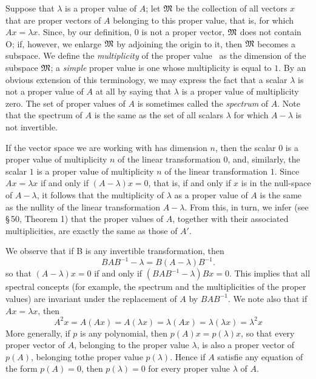 Suppose that \(\lambda\) is a proper value of \(A\); let \(\frak{M}\) be the
collection of all vectors \(x\) that are proper vectors of \(A\) belonging to
this proper value, that is, for which \(Ax = \lambda x\). Since, by our
definition, 0 is not a proper vector, \(\frak{M}\) does not contain O; if,
however, we enlarge \(\frak{M}\) by adjoining the origin to it, then
\(\frak{M}\) becomes a subspace. We define the \emph{multiplicity} of the proper
value \ as the dimension of the subspace \(\frak{M}\); a \emph{simple} proper
value is one whose multiplicity is equal to \(1\). By an obvious extension of
this terminology, we may express the fact that a scalar \(\lambda\) is not a
proper value of \(A\) at all by saying that \(\lambda\) is a proper value of
multiplicity zero. The set of proper values of \(A\) is sometimes called the
\emph{spectrum} of \(A\). Note that the spectrum of \(A\) is the same as the set
of all scalars \(\lambda\) for which \(A - \lambda\)  is not invertible.

If the vector space we are working with has dimension \(n\), then the scalar
\(0\) is a proper value of multiplicity \(n\) of the linear transformation
\(0\), and, similarly, the scalar \(1\) is a proper value of multiplicity \(n\)
of the linear transformation \(1\). Since \(Ax = \lambda x\) if and only if \((A
- \lambda)x = 0\), that is, if and only if \(x\) is in the null-space of \(A -
\lambda\), it follows that the multiplicity of \(\lambda\) as a proper value of
\(A\) is the same as the nullity of the linear transformation \(A - \lambda\).
From this, in turn, we infer (see \S\,50, Theorem 1) that the proper values of
\(A\), together with their associated multiplicities, are exactly the same as
those of \(A'\).

We observe that if B is any invertible transformation, then
\begin{equation*}
    BAB^{-1} - \lambda =B(A - \lambda)B^{-1}.
\end{equation*}
so that \((A - \lambda)x = 0\) if and only if \((BAB^{-1}- \lambda)Bx = 0\).
This implies that all spectral concepts (for example, the spectrum and the
multiplicities of the proper values) are invariant under the replacement of
\(A\) by \(BAB^{-1}\). We note also that if \(Ax = \lambda x\), then
\begin{equation*}
    A^2 x = A(Ax) = A(\lambda x) = \lambda (Ax) = \lambda(\lambda x) = \lambda^2 x
\end{equation*}
More generally, if \(p\) is any polynomial, then \(p(A)x = p(\lambda)x\), so
that every proper vector of \(A\), belonging to the proper value \(\lambda\), is also a proper
vector of \(p(A)\), belonging tothe proper value \(p(\lambda)\). Hence if \(A\) satisfie any equation of the form \(p(A) = 0\), then \(p(\lambda) = 0\) for every proper value \(\lambda\) of \(A\).

